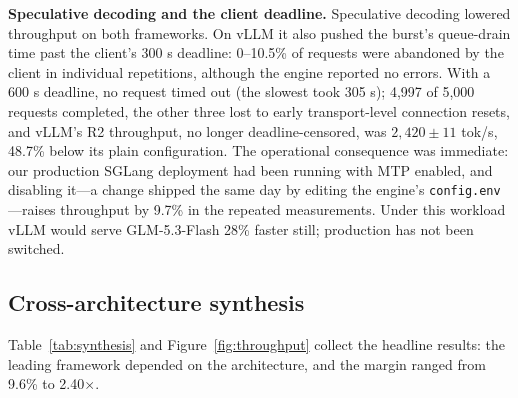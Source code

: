 \documentclass[11pt]{article}
\newcommand{\tps}{tok/s\xspace}
\begin{document}
\textbf{Speculative decoding and the client deadline.} Speculative decoding lowered throughput on both frameworks. On vLLM it also pushed the burst's queue-drain time past the client's 300 s deadline: 0--10.5\% of requests were abandoned by the client in individual repetitions, although the engine reported no errors. With a 600 s deadline, no request timed out (the slowest took 305 s); 4,997 of 5,000 requests completed, the other three lost to early transport-level connection resets, and vLLM's R2 throughput, no longer deadline-censored, was $2{,}420 \pm 11$ \tps, 48.7\% below its plain configuration. The operational consequence was immediate: our production SGLang deployment had been running with MTP enabled, and disabling it---a change shipped the same day by editing the engine's \texttt{config.env}---raises throughput by 9.7\% in the repeated measurements. Under this workload vLLM would serve GLM-5.3-Flash 28\% faster still; production has not been switched.

\subsection{Cross-architecture synthesis}
\label{sec:synthesis}

Table~\ref{tab:synthesis} and Figure~\ref{fig:throughput} collect the headline results: the leading framework depended on the architecture, and the margin ranged from 9.6\% to 2.40$\times$.
\end{document}
